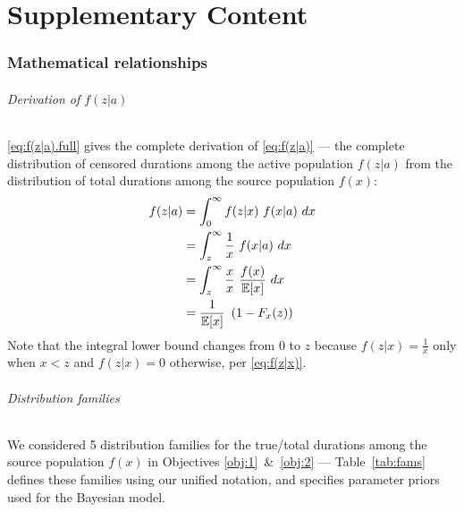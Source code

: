 \part{Supplementary Content}\label{supp}
\begin{table}[h]
  \centering
  \caption{Notation reference}
  \label{tab:notation}
  
\end{table}
\section{Mathematical relationships}\label{supp.math}
\paragraph{Derivation of $f(z|a)$}
\eqref{eq:f(z|a).full} gives the complete derivation of \eqref{eq:f(z|a)} --- \ie
the complete distribution of censored durations among the active population $f(z|a)$
from the distribution of total durations among the source population $f(x)$:
\cite{Tufto2017}
\begin{equation}
  \begin{aligned}
    f(z|a) &= \int_0^\infty f(z|x) ~ f(x|a) ~ dx \\
           &= \int_z^\infty \frac{1}{x} ~ f(x|a) ~ dx \\
           &= \int_z^\infty \frac{x}{x} ~ \frac{f(x)}{\mathbb{E}[x]} ~ dx \\
           &= \frac{1}{\mathbb{E}[x]} ~ \left(1 - F_x(z)\right)
  \end{aligned}
  \label{eq:f(z|a).full}
\end{equation}
Note that the integral lower bound changes from 0 to $z$ because
$f(z|x) = \frac{1}{x}$ only when $x < z$ and $f(z|x) = 0$ otherwise,
per \eqref{eq:f(z|x)}.
\clearpage
\paragraph{Distribution families}
We considered 5 distribution families for
the true/total durations among the source population $f(x)$
in Objectives \ref{obj:1}~\&~\ref{obj:2} ---
Table~\ref{tab:fams} defines these families using our unified notation,
and specifies parameter priors used for the Bayesian model.
\begin{table}[h]
  \centering
  \caption{Distribution families considered,
    using unified parameter notation ($\aa,\bb$)}
  \label{tab:fams}
  
\end{table}

